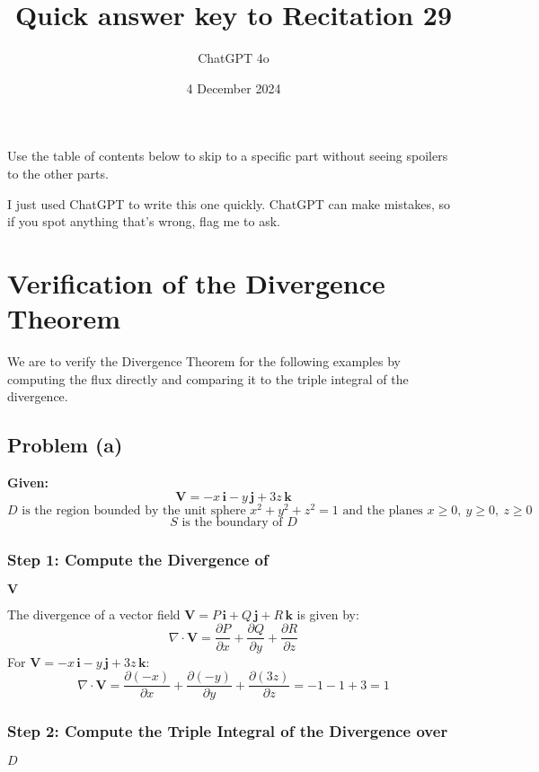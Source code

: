 \documentclass[11pt]{article}
\begin{document}
\title{Quick answer key to Recitation 29}
\author{ChatGPT 4o}
\date{4 December 2024}
\maketitle

Use the table of contents below to skip to a specific part
without seeing spoilers to the other parts.

I just used ChatGPT to write this one quickly.
ChatGPT can make mistakes, so if you spot anything that's wrong, flag me to ask.

\tableofcontents



\newpage

\section{Verification of the Divergence Theorem}

We are to verify the Divergence Theorem for the following examples by computing the flux directly and comparing it to the triple integral of the divergence.

\newpage

\subsection{Problem (a)}

\textbf{Given:}
\[
\mathbf{V} = -x\,\mathbf{i} - y\,\mathbf{j} + 3z\,\mathbf{k}
\]
\[
D \text{ is the region bounded by the unit sphere } x^2 + y^2 + z^2 = 1 \text{ and the planes } x \geq 0, \ y \geq 0, \ z \geq 0
\]
\[
S \text{ is the boundary of } D
\]

\subsubsection*{Step 1: Compute the Divergence of } $\mathbf{V}$

The divergence of a vector field \( \mathbf{V} = P\,\mathbf{i} + Q\,\mathbf{j} + R\,\mathbf{k} \) is given by:
\[
\nabla \cdot \mathbf{V} = \frac{\partial P}{\partial x} + \frac{\partial Q}{\partial y} + \frac{\partial R}{\partial z}
\]
For \( \mathbf{V} = -x\,\mathbf{i} - y\,\mathbf{j} + 3z\,\mathbf{k} \):
\[
\nabla \cdot \mathbf{V} = \frac{\partial (-x)}{\partial x} + \frac{\partial (-y)}{\partial y} + \frac{\partial (3z)}{\partial z} = -1 -1 + 3 = 1
\]

\subsubsection*{Step 2: Compute the Triple Integral of the Divergence over } $D$
\end{document}
